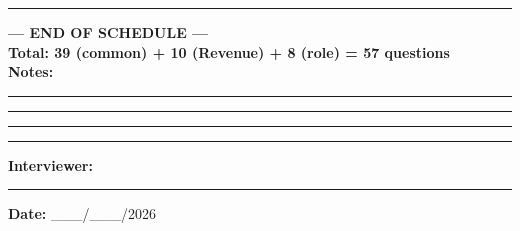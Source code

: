 \documentclass[10pt,a4paper]{article}
\begin{document}
\vspace{3pt}\noindent\rule{\textwidth}{1pt}
\begin{center}
{\large\bfseries --- END OF SCHEDULE ---}\\[2pt]
\textbf{Total: 39 (common) + 10 (Revenue) + 8 (role) = 57 questions}\\[8pt]
\textbf{Notes:}\vspace{3pt}

\rule{\textwidth}{0.4pt}\vspace{3pt}
\rule{\textwidth}{0.4pt}\vspace{3pt}
\rule{\textwidth}{0.4pt}\vspace{3pt}
\rule{\textwidth}{0.4pt}\vspace{4pt}

\textbf{Interviewer:} \rule{5cm}{0.4pt}\qquad\textbf{Date:} \_\_\_/\_\_\_/2026
\end{center}
\end{document}
